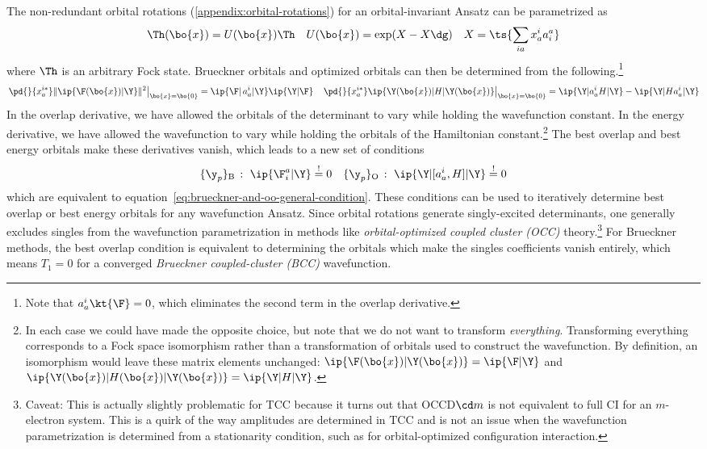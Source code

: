 \begin{rmk}
The non-redundant orbital rotations (\cref{appendix:orbital-rotations}) for an orbital-invariant Ansatz can be parametrized as
\begin{align}
  \Th(\bo{x})
=
  U(\bo{x})
  \Th
&&
  U(\bo{x})
=
  \text{exp}(X - X\dg)
&&
  X
=
\ts{
  \sum_{ia}
  x_a^i
  a^a_i
}
\end{align}
where $\Th$ is an arbitrary Fock state.
Brueckner orbitals and optimized orbitals can then be determined from the following.\footnote{%
  Note that $a^i_a\kt{\F}=0$, which eliminates the second term in the overlap derivative.
}
\begin{align}
\label{eq:brueckner-and-oo-condition-derivatives}
  \left.
  \pd{}{x_a^{i*}}
  \|\ip{\F(\bo{x})|\Y}\|^2
  \right|_{\bo{x}=\bo{0}}
=
  \ip{\F|\,a^i_a|\Y}
  \ip{\Y|\F}
&&
  \left.
  \pd{}{x_a^{i*}}
  \ip{\Y(\bo{x})|H|\Y(\bo{x})}
  \right|_{\bo{x}=\bo{0}}
=
  \ip{\Y|a^i_a H|\Y}
-
  \ip{\Y|H a^i_a|\Y}
\end{align}
In the overlap derivative, we have allowed the orbitals of the determinant to vary while holding the wavefunction constant.
In the energy derivative, we have allowed the wavefunction to vary while holding the orbitals of the Hamiltonian constant.\footnote{
  In each case we could have made the opposite choice, but note that we do not want to transform \textit{everything}.
  Transforming everything corresponds to a Fock space isomorphism rather than a transformation of orbitals used to construct the wavefunction.
  By definition, an isomorphism would leave these matrix elements unchanged:
  $
    \ip{\F(\bo{x})|\Y(\bo{x})}
  =
    \ip{\F|\Y}
  $
  and
  $
    \ip{\Y(\bo{x})|H(\bo{x})|\Y(\bo{x})}
  =
    \ip{\Y|H|\Y}
  $.
}
The best overlap and best energy orbitals make these derivatives vanish, which leads to a new set of conditions
\begin{align}
\label{eq:brueckner-and-oo-explicit-condition}
  \{\y_p\}_{\text{B}}\,:\,\,
  \ip{\F_i^a|\Y}
\overset{!}{=}
  0
&&
  \{\y_p\}_{\text{O}}\,:\,\,
  \ip{\Y|[a_a^i, H]|\Y}
\overset{!}{=}
  0
\end{align}
which are equivalent to equation~\ref{eq:brueckner-and-oo-general-condition}.
These conditions can be used to iteratively determine best overlap or best energy orbitals for any wavefunction Ansatz.
Since orbital rotations generate singly-excited determinants, one generally excludes singles from the wavefunction parametrization in methods like \textit{orbital-optimized coupled cluster (OCC)} theory.\footnote{%
  Caveat:
  This is actually slightly problematic for TCC because it turns out that OCCD${\cd}m$ is not equivalent to full CI for an $m$-electron system.
  This is a quirk of the way amplitudes are determined in TCC and is not an issue when the wavefunction parametrization is determined from a stationarity condition, such as for orbital-optimized configuration interaction.%
}
For Brueckner methods, the best overlap condition is equivalent to determining the orbitals which make the singles coefficients vanish entirely, which means $T_1=0$ for a converged \textit{Brueckner coupled-cluster (BCC)} wavefunction.
\end{rmk}

